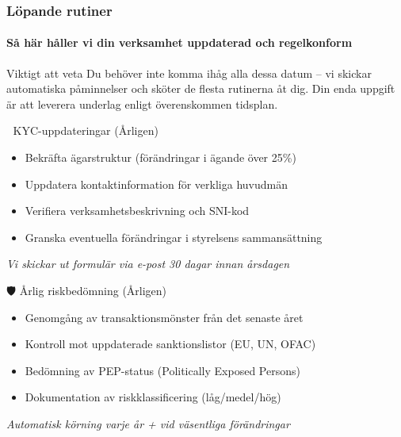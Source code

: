 \documentclass[10pt]{beamer}
\begin{document}
\begin{frame}[fragile]
  \frametitle{Löpande rutiner}
  \framesubtitle{Så här håller vi din verksamhet uppdaterad och regelkonform}

  \begin{block}{Viktigt att veta}
    Du behöver inte komma ihåg alla dessa datum – vi skickar automatiska påminnelser och 
    sköter de flesta rutinerna åt dig. Din enda uppgift är att leverera underlag enligt 
    överenskommen tidsplan.
  \end{block}

  \vspace{0.3cm}

  \begin{block}{🔄 KYC-uppdateringar (Årligen)}
    \footnotesize
    \begin{itemize}
      \item Bekräfta ägarstruktur (förändringar i ägande över 25\%)
      \item Uppdatera kontaktinformation för verkliga huvudmän
      \item Verifiera verksamhetsbeskrivning och SNI-kod
      \item Granska eventuella förändringar i styrelsens sammansättning
    \end{itemize}
    \textit{Vi skickar ut formulär via e-post 30 dagar innan årsdagen}
  \end{block}

  \vspace{0.3cm}

  \begin{block}{🛡️ Årlig riskbedömning (Årligen)}
    \footnotesize
    \begin{itemize}
      \item Genomgång av transaktionsmönster från det senaste året
      \item Kontroll mot uppdaterade sanktionslistor (EU, UN, OFAC)
      \item Bedömning av PEP-status (Politically Exposed Persons)
      \item Dokumentation av riskklassificering (låg/medel/hög)
    \end{itemize}
    \textit{Automatisk körning varje år + vid väsentliga förändringar}
  \end{block}


\end{frame}
\end{document}
